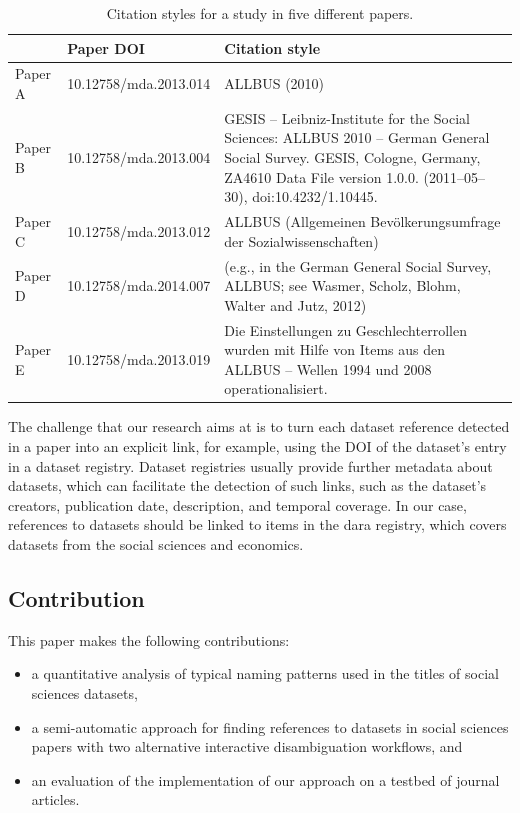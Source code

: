 \documentclass{IOS-Book-Article}
\newcommand{\dara}{\textsf{da\textbar ra}}
\begin{document}
\begin{table}[h!]
	\renewcommand{\arraystretch}{2}
	\centering
	\begin{tabular}{p{1cm}p{3cm}p{7cm}}
		\hline
		& \bf Paper DOI & \bf Citation style \\
		\hline
		Paper A  & 10.12758/mda.2013.014 &ALLBUS (2010)\\
		
		Paper B  & 10.12758/mda.2013.004 &GESIS -- Leibniz-Institute for the Social Sciences: ALLBUS 2010 -- German General Social Survey. GESIS, Cologne, Germany, ZA4610 Data File version 1.0.0. (2011--05--30), doi:10.4232/1.10445. \\ 
		
		Paper C & 10.12758/mda.2013.012 &ALLBUS (Allgemeinen Bev\"olkerungsumfrage der Sozialwissenschaften)\\
		
		Paper D & 10.12758/mda.2014.007 &(e.g., in the German General Social Survey, ALLBUS; see Wasmer, Scholz, Blohm, Walter and Jutz, 2012)\\
		
		Paper E & 10.12758/mda.2013.019 & Die Einstellungen zu Geschlechterrollen wurden mit Hilfe von Items aus den ALLBUS -- Wellen 1994 und 2008 operationalisiert.\\\hline
	\end{tabular}
	\caption{Citation styles for a study in five different papers.}
	\label{table:citation-variety}
\end{table}

The challenge that our research aims at is to turn each dataset reference detected in a paper into an explicit link, for example, using the DOI of the dataset's entry in a dataset registry. 
Dataset registries usually provide further metadata about datasets, which can facilitate the detection of such links, such as the dataset's creators, publication date, description, and temporal coverage.
In our case, references to datasets should be linked to items in the {\dara} registry, which covers datasets from the social sciences and economics.

\subsection{Contribution}

This paper makes the following contributions:
\begin{itemize}
\item a quantitative analysis of typical naming patterns used in the titles of social sciences datasets,
\item a semi-automatic approach for finding references to datasets in social sciences papers with two alternative interactive disambiguation workflows, and
\item an evaluation of the implementation of our approach on a testbed of journal articles.  
\end{itemize}
\end{document}
